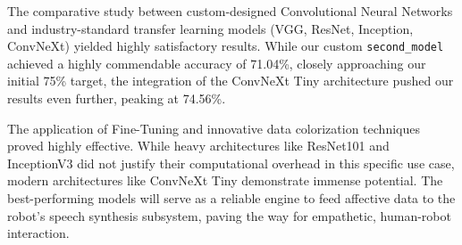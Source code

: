 \documentclass{article}
\begin{document}
The comparative study between custom-designed Convolutional Neural Networks and industry-standard transfer learning models (VGG, ResNet, Inception, ConvNeXt) yielded highly satisfactory results. While our custom \texttt{second\_model} achieved a highly commendable accuracy of 71.04\%, closely approaching our initial 75\% target, the integration of the ConvNeXt Tiny architecture pushed our results even further, peaking at 74.56\%.

The application of Fine-Tuning and innovative data colorization techniques proved highly effective. While heavy architectures like ResNet101 and InceptionV3 did not justify their computational overhead in this specific use case, modern architectures like ConvNeXt Tiny demonstrate immense potential. The best-performing models will serve as a reliable engine to feed affective data to the robot's speech synthesis subsystem, paving the way for empathetic, human-robot interaction.
\end{document}
